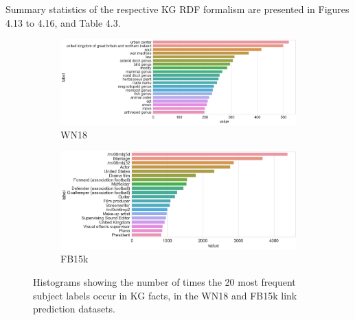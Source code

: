 \noindent Summary statistics of the respective KG RDF formalism are presented in Figures 4.13 to 4.16, and Table 4.3. 

\bigskip
\bigskip
\bigskip



\begin{figure}[H]
	\begin{subfigure}[b]{.5\linewidth}
   		\centering
    		\includegraphics[width=1.0\linewidth, height=0.7\linewidth]{WN18_Subject_Counts}
		\captionsetup{justification=centering}
		\caption{WN18}
	\end{subfigure}
	\begin{subfigure}[b]{.5\linewidth}
   		\centering
		\includegraphics[width=1.0\linewidth, height=0.7\linewidth]{FB15k_Subject_Counts}
		\captionsetup{justification=centering}
		\caption{FB15k}
	\end{subfigure}
	\caption{Histograms showing the number of times the 20 most frequent subject labels occur in KG facts, in the WN18 and FB15k link prediction datasets.}
\end{figure}

